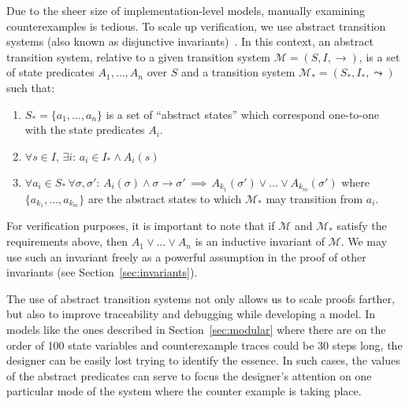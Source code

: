 \documentclass{llncs/llncs}
\newcommand{\tld}[1]{#1_{*}\xspace}
\begin{document}
Due to the sheer size of implementation-level models, manually examining counterexamples is tedious. To scale up verification, we use abstract transition systems (also known as disjunctive invariants)~\cite{Rushby00:CAV,timed-systems}. In this context, an abstract transition system, relative to a given transition system $\mathcal{M} = (S, I, \rightarrow)$, is a set of state predicates $A_1, \ldots, A_n$ over $S$ and a transition system $\tld{\mathcal{M}} = (\tld{S}, \tld{I}, \leadsto)$ such that:

\begin{enumerate}
    \item $\tld{S} = \{a_1, \ldots, a_n\}$ is a set of ``abstract states'' which correspond one-to-one with the state predicates $A_i$.
    \item $\forall s \in I, \, \exists i : \, a_i \in \tld{I} \wedge A_i(s)$
    \item $\forall a_i \in \tld{S} \, \forall \sigma, \sigma' : \, A_i(\sigma) \wedge \sigma \rightarrow \sigma' \, \implies \, A_{k_1}(\sigma') \vee \ldots \vee A_{k_m}(\sigma')$ where $\{a_{k_1}, \ldots, a_{k_m}\}$ are the abstract states to which $\tld{\mathcal{M}}$ may transition from $a_i$.
\end{enumerate}

For verification purposes, it is important to note that if $\mathcal{M}$ and $\tld{\mathcal{M}}$ satisfy the requirements above, then $A_1 \vee \ldots \vee A_n$ is an inductive invariant of $\mathcal{M}$. We may use such an invariant freely as a powerful assumption in the proof of other invariants (see Section~\ref{sec:invariants}).

The use of abstract transition systems not only allows us to scale proofs farther, but also to improve traceability and debugging while developing a model. In models like the ones described in Section~\ref{sec:modular} where there are on the order of 100 state variables and counterexample traces could be 30 steps long, the designer can be easily lost trying to identify the essence. In such cases, the values of the abstract predicates can serve to focus the designer's attention on one particular mode of the system where the counter example is taking place.

\end{document}
